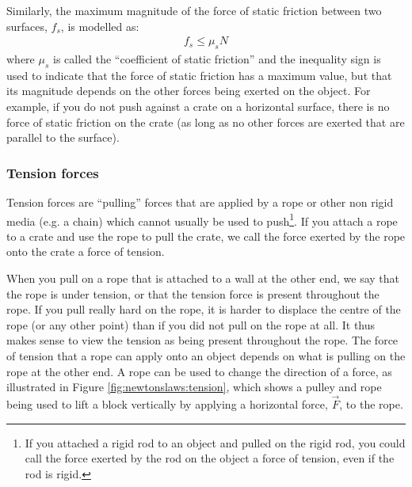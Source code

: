 Similarly, the maximum magnitude of the force of static friction between two surfaces, $f_s$, is modelled as:
\begin{align*}
f_s\leq\mu_sN
\end{align*}
where $\mu_s$ is called the ``coefficient of static friction'' and the inequality sign is used to indicate that the force of static friction has a maximum value, but that its magnitude depends on the other forces being exerted on the object. For example, if you do not push against a crate on a horizontal surface, there is no force of static friction on the crate (as long as no other forces are exerted that are parallel to the surface).



\subsubsection{Tension forces}
Tension forces are ``pulling'' forces that are applied by a rope or other non rigid media (e.g. a chain) which cannot usually be used to push\footnote{If you attached a rigid rod to an object and pulled on the rigid rod, you could call the force exerted by the rod on the object a force of tension, even if the rod is rigid.}. If you attach a rope to a crate and use the rope to pull the crate, we call the force exerted by the rope onto the crate a force of tension.

When you pull on a rope that is attached to a wall at the other end, we say that the rope is under tension, or that the tension force is present throughout the rope. If you pull really hard on the rope, it is harder to displace the centre of the rope (or any other point) than if you did not pull on the rope at all. It thus makes sense to view the tension as being present throughout the rope. The force of tension that a rope can apply onto an object depends on what is pulling on the rope at the other end. A rope can be used to change the direction of a force, as illustrated in Figure \ref{fig:newtonslaws:tension}, which shows a pulley and rope being used to lift a block vertically by applying a horizontal force, $\vec F$, to the rope.
 

